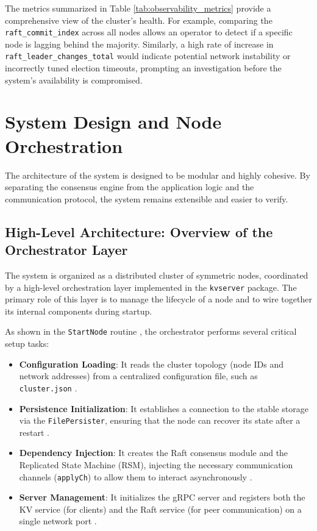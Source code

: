 The metrics summarized in Table \ref{tab:observability_metrics} provide a comprehensive view of the cluster's health. For example, comparing the \texttt{raft\_commit\_index} across all nodes allows an operator to detect if a specific node is lagging behind the majority. Similarly, a high rate of increase in \texttt{raft\_leader\_changes\_total} would indicate potential network instability or incorrectly tuned election timeouts, prompting an investigation before the system's availability is compromised.

\section{System Design and Node Orchestration}
The architecture of the system is designed to be modular and highly cohesive. By separating the consensus engine from the application logic and the communication protocol, the system remains extensible and easier to verify.

\subsection{High-Level Architecture: Overview of the Orchestrator Layer}
The system is organized as a distributed cluster of symmetric nodes, coordinated by a high-level orchestration layer implemented in the \texttt{kvserver} package. The primary role of this layer is to manage the lifecycle of a node and to wire together its internal components during startup.

As shown in the \texttt{StartNode} routine \cite{node_go}, the orchestrator performs several critical setup tasks:
\begin{itemize}
    \item \textbf{Configuration Loading}: It reads the cluster topology (node IDs and network addresses) from a centralized configuration file, such as \texttt{cluster.json} \cite{main_go}.
    \item \textbf{Persistence Initialization}: It establishes a connection to the stable storage via the \texttt{FilePersister}, ensuring that the node can recover its state after a restart \cite{node_go}.
    \item \textbf{Dependency Injection}: It creates the Raft consensus module and the Replicated State Machine (RSM), injecting the necessary communication channels (\texttt{applyCh}) to allow them to interact asynchronously \cite{node_go}.
    \item \textbf{Server Management}: It initializes the gRPC server and registers both the KV service (for clients) and the Raft service (for peer communication) on a single network port \cite{node_go}.
\end{itemize}

